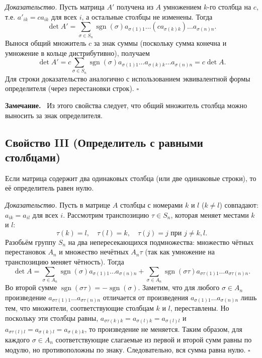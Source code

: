\documentclass[a4paper,12pt]{article}
\newcommand{\myremark}{\textbf{Замечание.}\ }
\theoremstyle{definition}
\theoremstyle{plain}
\theoremstyle{remark}
\begin{document}
	\medskip
	\textit{Доказательство.}
	Пусть матрица \( A' \) получена из \( A \) умножением \( k \)-го столбца на \( c \), т.е. \( a'_{ik} = c a_{ik} \) для всех \( i \), а остальные столбцы не изменены. Тогда
	\[
	\det A' = \sum_{\sigma \in S_n} \operatorname{sgn}(\sigma) a_{\sigma(1)1} \dots (c a_{\sigma(k)k}) \dots a_{\sigma(n)n}.
	\]
	Вынося общий множитель \( c \) за знак суммы (поскольку сумма конечна и умножение в кольце дистрибутивно), получаем
	\[
	\det A' = c \sum_{\sigma \in S_n} \operatorname{sgn}(\sigma) a_{\sigma(1)1} \dots a_{\sigma(k)k} \dots a_{\sigma(n)n} = c \det A.
	\]
	Для строки доказательство аналогично с использованием эквивалентной формы определителя (через перестановки строк). \hfill \(\square\)
	
	\myremark
	Из этого свойства следует, что общий множитель столбца можно выносить за знак определителя.
	
	\subsection{Свойство III (Определитель с равными столбцами)}
	
	\begin{tcolorbox}[colback=red!5, colframe=red!50!black, title=Свойство III]
		Если матрица содержит два одинаковых столбца (или две одинаковые строки), то её определитель равен нулю.
	\end{tcolorbox}
	
	\medskip
	\textit{Доказательство.}
	Пусть в матрице \( A \) столбцы с номерами \( k \) и \( l \) (\( k \neq l \)) совпадают: \( a_{ik} = a_{il} \) для всех \( i \). Рассмотрим транспозицию \( \tau \in S_n \), которая меняет местами \( k \) и \( l \):
	\[
	\tau(k) = l,\quad \tau(l) = k,\quad \tau(j) = j \text{ при } j \neq k,l.
	\]
	Разобьём группу \( S_n \) на два непересекающихся подмножества: множество чётных перестановок \( A_n \) и множество нечётных \( A_n \tau \) (так как умножение на транспозицию меняет чётность). Тогда
	\[
	\det A = \sum_{\sigma \in A_n} \operatorname{sgn}(\sigma) a_{\sigma(1)1} \dots a_{\sigma(n)n} + \sum_{\sigma \in A_n} \operatorname{sgn}(\sigma \tau) a_{\sigma\tau(1)1} \dots a_{\sigma\tau(n)n}.
	\]
	Во второй сумме \( \operatorname{sgn}(\sigma \tau) = -\operatorname{sgn}(\sigma) \). Заметим, что для любого \( \sigma \in A_n \) произведение \( a_{\sigma\tau(1)1} \dots a_{\sigma\tau(n)n} \) отличается от произведения \( a_{\sigma(1)1} \dots a_{\sigma(n)n} \) лишь тем, что множители, соответствующие столбцам \( k \) и \( l \), переставлены. Но поскольку эти столбцы равны, \( a_{\sigma\tau(k)k} = a_{\sigma(l)k} = a_{\sigma(l)l} \) и \( a_{\sigma\tau(l)l} = a_{\sigma(k)l} = a_{\sigma(k)k} \), то произведение не меняется. Таким образом, для каждого \( \sigma \in A_n \) соответствующие слагаемые из первой и второй сумм равны по модулю, но противоположны по знаку. Следовательно, вся сумма равна нулю. \hfill \(\square\)
	
\end{document}
